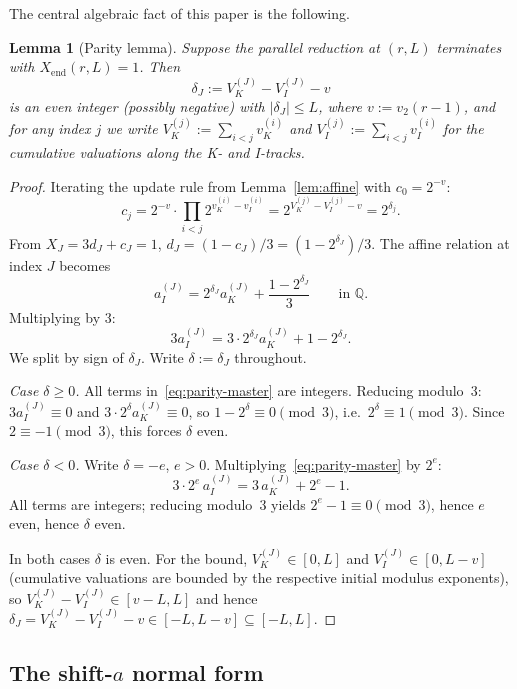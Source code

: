 \documentclass[11pt,reqno]{amsart}
\theoremstyle{plain}
\newtheorem{lemma}[theorem]{Lemma}
\theoremstyle{definition}
\theoremstyle{remark}
\newcommand{\Q}{\mathbb{Q}}
\newcommand{\Xend}{X_{\mathrm{end}}}
\newcommand{\Vk}{V_{K}}
\newcommand{\Vi}{V_{I}}
\newcommand{\vk}{v_{K}}
\newcommand{\vi}{v_{I}}
\newcommand{\vtwo}{v_{2}}
\begin{document}
The central algebraic fact of this paper is the following.

\begin{lemma}[Parity lemma]
\label{lem:parity}
Suppose the parallel reduction at $(r, L)$ terminates with $\Xend(r, L) = 1$.
Then
\[
\delta_J := \Vk^{(J)} - \Vi^{(J)} - v
\]
is an \emph{even} integer (possibly negative) with $|\delta_J| \le L$,
where $v := \vtwo(r-1)$, and for any index $j$ we write
$\Vk^{(j)} := \sum_{i < j} \vk^{(i)}$ and
$\Vi^{(j)} := \sum_{i < j} \vi^{(i)}$ for the cumulative valuations
along the K- and I-tracks.
\end{lemma}

\begin{proof}
Iterating the update rule from Lemma~\ref{lem:affine} with $c_0 = 2^{-v}$:
\[
c_j = 2^{-v} \cdot \prod_{i < j} 2^{\vk^{(i)} - \vi^{(i)}} = 2^{\Vk^{(j)} - \Vi^{(j)} - v} = 2^{\delta_j}.
\]
From $X_J = 3 d_J + c_J = 1$, $d_J = (1 - c_J)/3 = (1 - 2^{\delta_J})/3$.
The affine relation at index $J$ becomes
\[
a_I^{(J)} = 2^{\delta_J} a_K^{(J)} + \frac{1 - 2^{\delta_J}}{3} \qquad \text{in } \Q.
\]
Multiplying by $3$:
\begin{equation}\label{eq:parity-master}
3 a_I^{(J)} = 3 \cdot 2^{\delta_J} a_K^{(J)} + 1 - 2^{\delta_J}.
\end{equation}
We split by sign of $\delta_J$. Write $\delta := \delta_J$ throughout.

\emph{Case $\delta \ge 0$.} All terms in~\eqref{eq:parity-master} are integers.
Reducing modulo~$3$: $3 a_I^{(J)} \equiv 0$ and $3 \cdot 2^\delta a_K^{(J)} \equiv 0$,
so $1 - 2^\delta \equiv 0 \pmod 3$, i.e.\ $2^\delta \equiv 1 \pmod 3$. Since
$2 \equiv -1 \pmod 3$, this forces $\delta$ even.

\emph{Case $\delta < 0$.} Write $\delta = -e$, $e > 0$. Multiplying~\eqref{eq:parity-master}
by $2^e$:
\[
3 \cdot 2^e \, a_I^{(J)} = 3 \, a_K^{(J)} + 2^e - 1.
\]
All terms are integers; reducing modulo~$3$ yields $2^e - 1 \equiv 0 \pmod 3$,
hence $e$ even, hence $\delta$ even.

In both cases $\delta$ is even. For the bound, $\Vk^{(J)} \in [0, L]$ and
$\Vi^{(J)} \in [0, L - v]$ (cumulative valuations are bounded by the
respective initial modulus exponents), so
$\Vk^{(J)} - \Vi^{(J)} \in [v - L, L]$ and hence
$\delta_J = \Vk^{(J)} - \Vi^{(J)} - v \in [-L, L - v] \subseteq [-L, L]$.
\qedhere
\end{proof}

\subsection{The shift-\texorpdfstring{$a$}{a} normal form}
\end{document}

